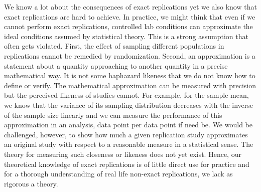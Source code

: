 \documentclass[meta,authordate]{jote-new-article}
\begin{document}
We know a lot about the consequences of exact replications yet we also know that exact replications are hard to achieve. In practice, we might think that even if we cannot perform exact replications, controlled lab conditions can approximate the ideal conditions assumed by statistical theory. This is a strong assumption that often gets violated. First, the effect of sampling different populations in replications cannot be remedied by randomization. Second, an approximation is a statement about a quantity approaching to another quantity in a precise mathematical way. It is not some haphazard likeness that we do not know how to define or verify. The mathematical approximation can be measured with precision but the perceived likeness of studies cannot. For example, for the sample mean, we know that the variance of its sampling distribution decreases with the inverse of the sample size linearly and we can measure the performance of this approximation in an analysis, data point per data point if need be. We would be challenged, however, to show how much a given replication study approximates an original study with respect to a reasonable measure in a statistical sense. The theory for measuring such closeness or likeness does not yet exist. Hence, our theoretical knowledge of exact replications is of little direct use for practice and for a thorough understanding of real life non-exact replications, we lack as rigorous a theory.




\end{document}

